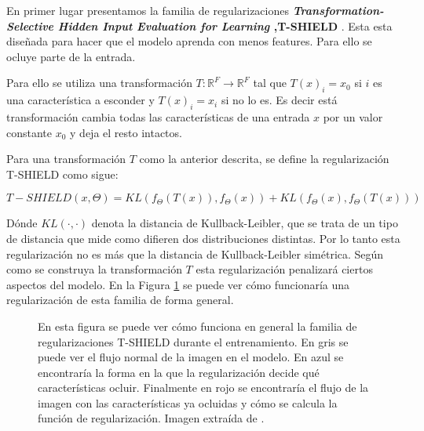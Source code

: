 En primer lugar presentamos la familia de regularizaciones \textbf{\textit{Transformation-Selective Hidden Input Evaluation for Learning} ,T-SHIELD} \cite{XSHIELD}. Esta esta diseñada para hacer que el modelo aprenda con menos features. Para ello se ocluye parte de la entrada. 

Para ello se utiliza una transformación $T: \mathbb{R}^F \rightarrow \mathbb{R}^F$ tal que $T(x)_i = x_0$ si $i$ es una característica a esconder y $T(x)_i = x_i$ si no lo es. Es decir está transformación cambia todas las características de una entrada $x$ por un valor constante $x_0$ y deja el resto intactos.

Para una transformación $T$ como la anterior descrita, se define la regularización T-SHIELD como sigue:

\begin{equation}
T-SHIELD(x,\Theta) = KL(f_\Theta(T(x)),f_\Theta(x)) + KL(f_\Theta(x),f_\Theta(T(x))) 
\end{equation}

Dónde $KL(\cdot,\cdot)$ denota la distancia de Kullback-Leibler, que se trata de un tipo de distancia que mide como difieren dos distribuciones distintas. Por lo tanto esta regularización no es más que la distancia de Kullback-Leibler simétrica. Según como se construya la transformación $T$ esta regularización penalizará ciertos aspectos del modelo. En la Figura \ref{fig:tshield_flow} se puede ver cómo funcionaría una regularización de esta familia de forma general.

\begin{figure}[h]
\noindent
{}
\caption{ En esta figura se puede ver cómo funciona en general la familia de regularizaciones T-SHIELD durante el entrenamiento. En gris se puede ver el flujo normal de la imagen en el modelo. En azul se encontraría la forma en la que la regularización decide qué características ocluir. Finalmente en rojo se encontraría el flujo de la imagen con las características ya ocluidas y cómo se calcula la función de regularización. Imagen extraída de \cite{REVEL}.}
\label{fig:tshield_flow}
\end{figure}

